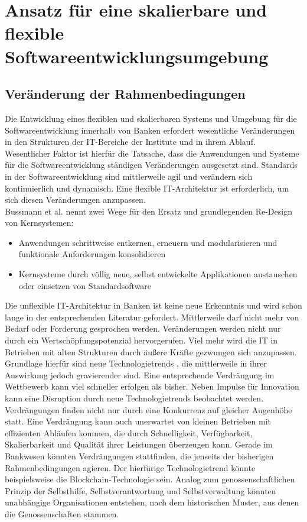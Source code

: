 \chapter{Ansatz für eine skalierbare und flexible Softwareentwicklungsumgebung}
\label{ch:chapter04}

\section{Veränderung der Rahmenbedingungen}

Die Entwicklung eines flexiblen und skalierbaren Systems und Umgebung für die Softwareentwicklung innerhalb von Banken erfordert wesentliche Veränderungen in den Strukturen der IT-Bereiche der Institute und in ihrem Ablauf. Wesentlicher Faktor ist hierfür die Tatsache, dass die Anwendungen und Systeme für die Softwareentwicklung ständigen Veränderungen ausgesetzt sind. Standards in der Softwareentwicklung sind mittlerweile agil und verändern sich kontinuierlich und dynamisch. Eine flexible IT-Architektur ist erforderlich, um sich diesen Veränderungen anzupassen.
\medskip
\\
Bussmann et al. nennt zwei Wege für den Ersatz und grundlegenden Re-Design von Kernsystemen: \cite{Bussmann2006}
\begin{itemize}
    \item Anwendungen schrittweise entkernen, erneuern und modularisieren und funktionale Anforderungen konsolidieren
    \item Kernsysteme durch völlig neue, selbst entwickelte Applikationen austauschen oder einsetzen von Standardsoftware
\end{itemize}
%

Die unflexible IT-Architektur in Banken ist keine neue Erkenntnis und wird schon lange in der entsprechenden Literatur gefordert. Mittlerweile darf nicht mehr von Bedarf oder Forderung gesprochen werden. Veränderungen werden nicht nur durch ein Wertschöpfungspotenzial hervorgerufen. Viel mehr wird die IT in Betrieben mit alten Strukturen durch äußere Kräfte gezwungen sich anzupassen. Grundlage hierfür sind neue Technologietrends \cite{Bussmann2006}, die mittlerweile in ihrer Auswirkung jedoch gravierender sind. Eine entsprechende Verdrängung im Wettbewerb kann viel schneller erfolgen als bisher. Neben Impulse für Innovation kann eine Disruption durch neue Technologietrends beobachtet werden.
\medskip
\\
Verdrängungen finden nicht nur durch eine Konkurrenz auf gleicher Augenhöhe statt. Eine Verdrängung kann auch unerwartet von kleinen Betrieben mit effizienten Abläufen kommen, die durch Schnelligkeit, Verfügbarkeit, Skalierbarkeit und Qualität ihrer Leistungen überzeugen kann.  Gerade im Bankwesen könnten Verdrängungen stattfinden, die jenseits der bisherigen Rahmenbedingungen agieren. Der hierfürige Technologietrend könnte beispielsweise die Blockchain-Technologie sein. Analog zum genossenschaftlichen Prinzip der Selbsthilfe, Selbstverantwortung und Selbstverwaltung könnten unabhängige Organisationen entstehen, nach dem historischen Muster, aus denen die Genossenschaften stammen. 

